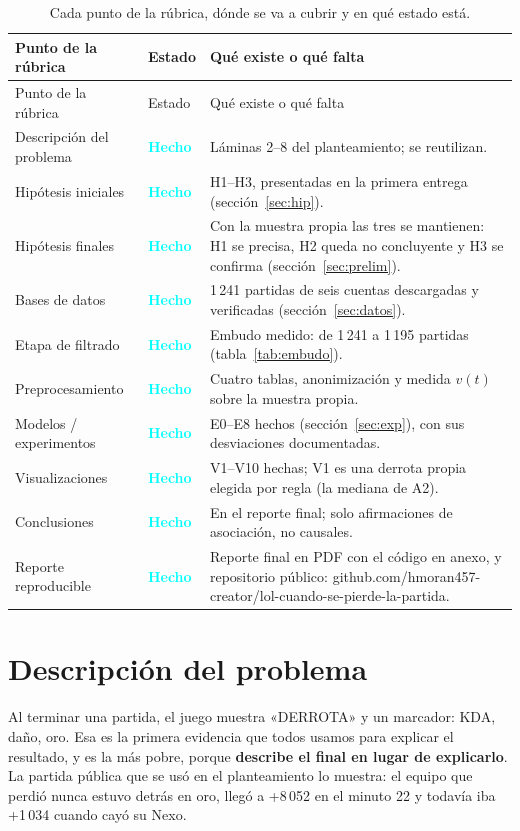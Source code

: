 \documentclass[11pt,letterpaper]{article}
\newcommand{\hecho}{\textcolor{aqua}{\textbf{Hecho}}}
\begin{document}
\begin{longtable}{p{4.6cm}p{2.0cm}p{8.0cm}}
\caption{Cada punto de la rúbrica, dónde se va a cubrir y en qué estado está.}\\
\toprule
Punto de la rúbrica & Estado & Qué existe o qué falta \\
\midrule
\endfirsthead
\toprule
Punto de la rúbrica & Estado & Qué existe o qué falta \\
\midrule
\endhead
Descripción del problema & \hecho & Láminas 2--8 del planteamiento; se reutilizan. \\
Hipótesis iniciales & \hecho & H1--H3, presentadas en la primera entrega (sección~\ref{sec:hip}). \\
Hipótesis finales & \hecho & Con la muestra propia las tres se mantienen: H1 se precisa, H2 queda no concluyente y H3 se confirma (sección~\ref{sec:prelim}). \\
Bases de datos & \hecho & 1\,241 partidas de seis cuentas descargadas y verificadas (sección~\ref{sec:datos}). \\
Etapa de filtrado & \hecho & Embudo medido: de 1\,241 a 1\,195 partidas (tabla~\ref{tab:embudo}). \\
Preprocesamiento & \hecho & Cuatro tablas, anonimización y medida \(v(t)\) sobre la muestra propia. \\
Modelos / experimentos & \hecho & E0--E8 hechos (sección~\ref{sec:exp}), con sus desviaciones documentadas. \\
Visualizaciones & \hecho & V1--V10 hechas; V1 es una derrota propia elegida por regla (la mediana de A2). \\
Conclusiones & \hecho & En el reporte final; solo afirmaciones de asociación, no causales. \\
Reporte reproducible & \hecho & Reporte final en PDF con el código en anexo, y repositorio público: github.com/hmoran457-creator/lol-cuando-se-pierde-la-partida. \\
\bottomrule
\end{longtable}

\section{Descripción del problema}

Al terminar una partida, el juego muestra «DERROTA» y un marcador: KDA, daño, oro.
Esa es la primera evidencia que todos usamos para explicar el resultado, y es la más
pobre, porque \textbf{describe el final en lugar de explicarlo}. La partida pública
que se usó en el planteamiento lo muestra: el equipo que perdió nunca estuvo detrás
en oro, llegó a +8\,052 en el minuto 22 y todavía iba +1\,034 cuando cayó su Nexo.
\end{document}
